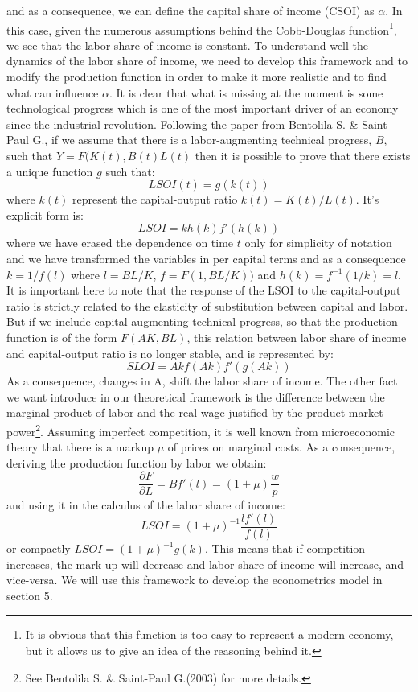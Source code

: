 \documentclass[12pt, letterpaper]{article}
\numberwithin{table}{section}   %
\begin{document}
and as a consequence, we can define the capital share of income (CSOI) as $\alpha$. 
In this case, given the numerous assumptions behind the Cobb-Douglas function\footnote{It is obvious that this function is too easy to represent a modern economy, but it allows us to give an idea of the reasoning behind it.}, we see that the labor share of income is constant. To understand well the dynamics of the labor share of income, we need to  develop this framework and to modify the production function in order to make it more realistic and to find what  can influence $\alpha$. It is clear that what is missing at the moment is some technological progress which is one of the most important driver of an economy since the industrial revolution. Following the paper from Bentolila S. \& Saint-Paul G., if we assume that there is a labor-augmenting technical progress, $B$, such that $Y = F(K(t),B(t)L(t)$ then it is possible to prove that there exists a unique function $g$ such that:
\begin{equation*}
    LSOI(t) = g(k(t))
\end{equation*}
where $k(t)$ represent the capital-output ratio $k(t) = K(t)/L(t)$.
It's explicit form is:
\begin{equation*}
    LSOI = kh(k)f'(h(k))
\end{equation*}
where we have erased the dependence on time $t$ only for simplicity of notation and we have transformed the variables in per capital terms and as a consequence $k=1/f(l)$ where $l = BL/K$, $f = F(1,BL/K))$ and $h(k) = f^{-1}(1/k)= l$. 
It is important here to note that the response of the LSOI to the capital-output ratio is strictly related to the elasticity of substitution between capital and labor.
But if we include capital-augmenting technical progress, so that the production function is of the form $F(AK,BL)$, this relation between labor share of income and capital-output ratio is no longer stable, and is represented by:
\begin{equation*}
    SLOI = Akf(Ak)f'(g(Ak))
\end{equation*}
As a consequence, changes in A, shift the labor share of income.
The other fact we want introduce in our theoretical framework is the difference between the marginal product of labor and the real wage justified by the product market power\footnote{See Bentolila S. \& Saint-Paul G.(2003) for more details.}.
Assuming imperfect competition, it is well known from microeconomic theory that there is a markup $\mu$ of prices on marginal costs. As a consequence, deriving the production function by labor we obtain:
\begin{equation*}
    \frac{\partial F}{\partial L} = Bf'(l) = (1+\mu) \frac{w}{p}
\end{equation*}
and using it in the calculus of the labor share of income:
\begin{equation*}
    LSOI = (1+\mu)^{-1}\frac{lf'(l)}{f(l)}
\end{equation*}
or compactly $LSOI = (1+\mu)^{-1}g(k)$. This means that if competition increases, the mark-up will decrease and labor share of income will increase, and vice-versa.  We will use this framework to develop the econometrics model in section 5.
\end{document}
